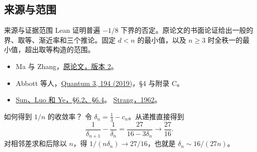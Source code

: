 \documentclass{beamer}
\begin{document}
\subsection{来源与范围}
\begin{frame}{来源与证据范围}
Lean 证明普遍 $-1/8$ 下界的否定。原论文的书面论证给出一般的界、取等、渐近率和三个推论。固定 $d<n$ 的最小值，以及 $n\ge3$ 时全秩一的最小值，超出取等构造的范围。
\smallskip
\begin{itemize}
\item Ma 与 Zhang，\href{https://doi.org/10.5281/zenodo.24212412}{原论文，版本 2}。
\item Abbott 等人，\href{https://doi.org/10.22331/q-2019-10-14-194}{Quantum 3, 194 (2019)}，§4 与附录 C。
\item \href{https://arxiv.org/abs/1503.06387v3}{Sun、Luo 和 Ye，§6.2、§6.4}。 \href{https://doi.org/10.2307/2312733}{Strang，1962}。
\end{itemize}
\end{frame}

\appendix
\begin{frame}{如何得到 $1/n$ 的收敛率？}
令 $\delta_n=\tfrac13-c_n$。从递推直接得到
\[
 \frac1{\delta_{n+1}}-\frac1{\delta_n}
 =\frac{27}{16-3\delta_n}\longrightarrow\frac{27}{16}.
\]
对相邻差求和后除以 $n$，得 $1/(n\delta_n)\to27/16$，也就是 $\delta_n\sim16/(27n)$。
\end{frame}

\FormalVerification
\end{document}
